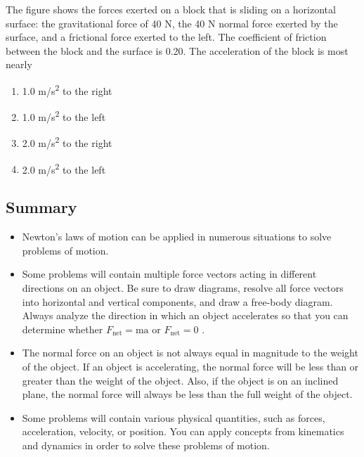 \documentclass[
]{book}
\providecommand{\tightlist}{%
  \setlength{\itemsep}{0pt}\setlength{\parskip}{0pt}}
\begin{document}
The figure shows the forces exerted on a block that is sliding on a
horizontal surface: the gravitational force of 40 N, the 40 N normal
force exerted by the surface, and a frictional force exerted to the
left. The coefficient of friction between the block and the surface is
0.20. The acceleration of the block is most nearly

\begin{enumerate}
\def\labelenumi{\alph{enumi}.}
\tightlist
\item
  1.0 m/s\textsuperscript{2} to the right
\item
  1.0 m/s\textsuperscript{2} to the left
\item
  2.0 m/s\textsuperscript{2} to the right
\item
  2.0 m/s\textsuperscript{2} to the left
\end{enumerate}

\hypertarget{fs-id1596051-summary}{}
\hypertarget{summary-5}{%
\subsection{Summary}\label{summary-5}}

\begin{itemize}
\tightlist
\item
  \protect\hypertarget{import-auto-id1586681}{}{Newton's laws of motion can be applied in numerous situations to
  solve problems of motion.}
\item
  \protect\hypertarget{import-auto-id1586684}{}{Some problems will contain multiple force vectors acting in
  different directions on an object. Be sure to draw diagrams, resolve
  all force vectors into horizontal and vertical components, and draw
  a free-body diagram. Always analyze the direction in which an object
  accelerates so that you can determine whether
  \({F_{\text{net}} = \text{ma}}{}\) or \({F_{\text{net}} = 0}{}\)
  .}
\item
  \protect\hypertarget{import-auto-id3305501}{}{The normal force on an object is not always equal in magnitude to
  the weight of the object. If an object is accelerating, the normal
  force will be less than or greater than the weight of the object.
  Also, if the object is on an inclined plane, the normal force will
  always be less than the full weight of the
  object.}
\item
  \protect\hypertarget{import-auto-id2653368}{}{Some problems will contain various physical quantities, such as
  forces, acceleration, velocity, or position. You can apply concepts
  from kinematics and dynamics in order to solve these problems of
  motion.}
\end{itemize}
\end{document}
